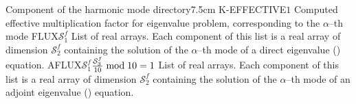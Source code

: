 \begin{DescriptionEnregistrement}{Component of the harmonic mode directory}{7.5cm}
\RealEnr
  {K-EFFECTIVE}{$1$}{}
  {Computed effective multiplication factor for eigenvalue problem,
  corresponding to the $\alpha$--th mode}
\DirlEnr
  {FLUX}{$\mathcal{S}^{f}_{1}$}
  {List of real arrays. Each component of this list is a real array of dimension $\mathcal{S}^{f}_{2}$
  containing the solution of the $\alpha$--th mode of a direct eigenvalue () equation.}
\OptDirlEnr
  {AFLUX}{$\mathcal{S}^{f}_{1}$}{${\mathcal{S}^{f}_{3}\over 10} \bmod 10 = 1$}
  {List of real arrays. Each component of this list is a real array of dimension $\mathcal{S}^{f}_{2}$
  containing the solution of the $\alpha$--th mode of an adjoint eigenvalue () equation.}
\end{DescriptionEnregistrement}

\eject
